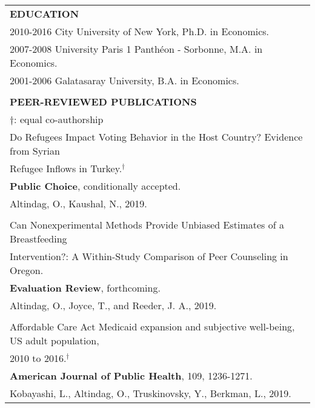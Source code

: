 \documentclass[12 pt]{article}
\begin{document}
\begin{longtable}{ccccc}
\\


\multicolumn{5}{l}{\textbf{EDUCATION}}\\[2 pt]
  \multicolumn{4}{l}{2010\phantom{7}-\phantom{8}2016 \phantom{0000}City University of New York, Ph.D. in Economics.}     \\
    \multicolumn{4}{l}{2007\phantom{1}-\phantom{6}2008 \phantom{000..}University Paris 1 Panth\'{e}on - Sorbonne, M.A. in Economics.} \\
\multicolumn{4}{l}{2001\phantom{1}-\phantom{0}2006 \phantom{000.} Galatasaray University,  B.A. in Economics.}  \\
\\

\multicolumn{5}{l}{\textbf{PEER-REVIEWED PUBLICATIONS }} \\ 
 \multicolumn{5}{l}{\footnotesize{$\dagger$: equal co-authorship}} \\[4 pt]



   \multicolumn{5}{l}{Do Refugees Impact Voting Behavior in the Host Country? Evidence from Syrian} \\
    \multicolumn{5}{l}{Refugee Inflows in Turkey.$^{\dagger}$} \\
     \multicolumn{5}{l}{\textbf{Public Choice}, conditionally accepted.} \\  
 \multicolumn{5}{l}{Altindag, O., Kaushal, N., 2019.} \\
\\

   \multicolumn{5}{l}{Can Nonexperimental Methods Provide Unbiased Estimates of a Breastfeeding} \\
  \multicolumn{5}{l}{Intervention?: A Within-Study Comparison of Peer Counseling in Oregon. } \\
    \multicolumn{5}{l}{\textbf{Evaluation Review}, forthcoming.} \\
 \multicolumn{5}{l}{Altindag, O., Joyce, T., and Reeder, J. A., 2019.} \\



 \\ 

  \multicolumn{5}{l}{Affordable Care Act Medicaid expansion and subjective well-being, US adult population, } \\
    \multicolumn{5}{l}{2010 to 2016.$^{\dagger}$} \\
   \multicolumn{5}{l}{\textbf{American Journal of Public Health}, 109, 1236-1271.} \\
   \multicolumn{5}{l}{Kobayashi, L., Altindag, O., Truskinovsky, Y., Berkman, L., 2019.}  \\


\end{longtable}
\end{document}
